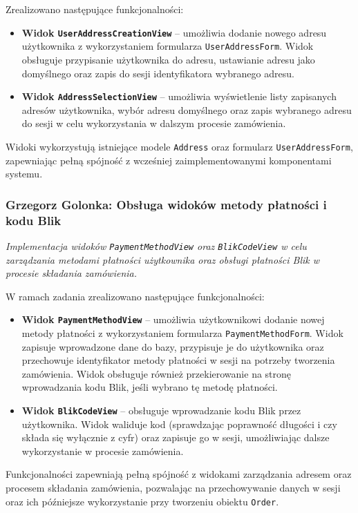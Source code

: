 \documentclass[12pt,a4paper,oneside]{article}
\theoremstyle{definition}
\numberwithin{equation}{section}
\begin{document}
Zrealizowano następujące funkcjonalności:
\begin{itemize}
    \item \textbf{Widok \texttt{UserAddressCreationView}} – umożliwia dodanie nowego adresu użytkownika z wykorzystaniem formularza \texttt{UserAddressForm}. Widok obsługuje przypisanie użytkownika do adresu, ustawianie adresu jako domyślnego oraz zapis do sesji identyfikatora wybranego adresu.
    \item \textbf{Widok \texttt{AddressSelectionView}} – umożliwia wyświetlenie listy zapisanych adresów użytkownika, wybór adresu domyślnego oraz zapis wybranego adresu do sesji w celu wykorzystania w dalszym procesie zamówienia.
\end{itemize}

Widoki wykorzystują istniejące modele \texttt{Address} oraz formularz \texttt{UserAddressForm}, zapewniając pełną spójność z wcześniej zaimplementowanymi komponentami systemu.

%
%
\subsubsection{Grzegorz Golonka: Obsługa widoków metody płatności i kodu Blik}
\label{section:1.3.25}
\textit{
Implementacja widoków \texttt{PaymentMethodView} oraz \texttt{BlikCodeView} w celu zarządzania metodami płatności użytkownika oraz obsługi płatności Blik w procesie składania zamówienia.
}

W ramach zadania zrealizowano następujące funkcjonalności:
\begin{itemize}
    \item \textbf{Widok \texttt{PaymentMethodView}} – umożliwia użytkownikowi dodanie nowej metody płatności z wykorzystaniem formularza \texttt{PaymentMethodForm}. Widok zapisuje wprowadzone dane do bazy, przypisuje je do użytkownika oraz przechowuje identyfikator metody płatności w sesji na potrzeby tworzenia zamówienia. Widok obsługuje również przekierowanie na stronę wprowadzania kodu Blik, jeśli wybrano tę metodę płatności.
    \item \textbf{Widok \texttt{BlikCodeView}} – obsługuje wprowadzanie kodu Blik przez użytkownika. Widok waliduje kod (sprawdzając poprawność długości i czy składa się wyłącznie z cyfr) oraz zapisuje go w sesji, umożliwiając dalsze wykorzystanie w procesie zamówienia.
\end{itemize}

Funkcjonalności zapewniają pełną spójność z widokami zarządzania adresem oraz procesem składania zamówienia, pozwalając na przechowywanie danych w sesji oraz ich późniejsze wykorzystanie przy tworzeniu obiektu \texttt{Order}.
\end{document}
